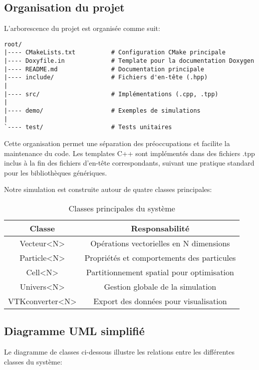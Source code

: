 \documentclass[12pt,a4paper]{article}
\begin{document}
\subsection{Organisation du projet}

L'arborescence du projet est organisée comme suit:

\begin{verbatim}
root/
|---- CMakeLists.txt          # Configuration CMake principale
|---- Doxyfile.in             # Template pour la documentation Doxygen
|---- README.md               # Documentation principale
|---- include/                # Fichiers d'en-tête (.hpp)
|
|---- src/                    # Implémentations (.cpp, .tpp)
|
|---- demo/                   # Exemples de simulations
|
`---- test/                   # Tests unitaires
\end{verbatim}

Cette organisation permet une séparation des préoccupations et facilite la maintenance du code. Les templates C++ sont implémentés dans des fichiers .tpp inclus à la fin des fichiers d'en-tête correspondants, suivant une pratique standard pour les bibliothèques génériques.

Notre simulation est construite autour de quatre classes principales:

\begin{table}[H]
\centering
\begin{tabular}{|c|c|}
\hline
\textbf{Classe} & \textbf{Responsabilité} \\
\hline
Vecteur<N> & Opérations vectorielles en N dimensions \\
\hline
Particle<N> & Propriétés et comportements des particules \\
\hline
Cell<N> & Partitionnement spatial pour optimisation \\
\hline
Univers<N> & Gestion globale de la simulation \\
\hline
VTKconverter<N> & Export des données pour visualisation \\
\hline
\end{tabular}
\caption{Classes principales du système}
\end{table}

\subsection{Diagramme UML simplifié}

Le diagramme de classes ci-dessous illustre les relations entre les différentes classes du système:
\end{document}
